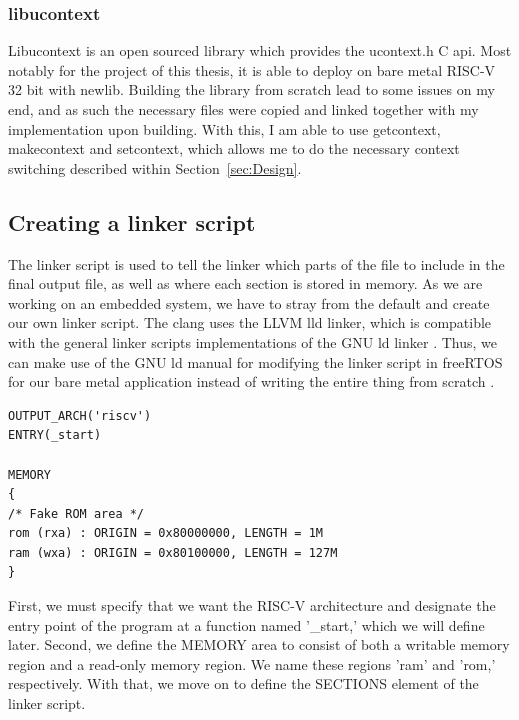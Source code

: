 \subsubsection*{libucontext}
Libucontext is an open sourced library which provides the ucontext.h C api. Most
notably for the project of this thesis, it is able to deploy on bare metal
RISC-V 32 bit with newlib. Building the library from scratch lead to some issues
on my end, and as such the necessary files were copied and linked together with
my implementation upon building. With this, I am able to use getcontext,
makecontext and setcontext, which allows me to do the necessary context
switching described within Section~\ref{sec:Design}.


\subsection{Creating a linker script}
The linker script is used to tell the linker which parts of the file to include
in the final output file, as well as where each section is stored in memory. As
we are working on an embedded system, we have to stray from the default and
create our own linker script. The clang uses the LLVM lld linker, which is
compatible with the general linker scripts implementations of the GNU ld linker
\cite{llvm-org-linker}. Thus, we can make use of the GNU ld manual for modifying
the linker script in freeRTOS for our bare metal application instead of writing
the entire thing from scratch \cite{GNU-linker}.

\begin{lstlisting}[caption=Memory area defined in linker script]
OUTPUT_ARCH('riscv')
ENTRY(_start)

MEMORY
{
/* Fake ROM area */
rom (rxa) : ORIGIN = 0x80000000, LENGTH = 1M
ram (wxa) : ORIGIN = 0x80100000, LENGTH = 127M
}
\end{lstlisting}
First, we must specify that we want the RISC-V architecture and designate the
entry point of the program at a function named '\_start,' which we will define
later. Second, we define the MEMORY area to consist of both a writable memory
region and a read-only memory region. We name these regions 'ram' and 'rom,'
respectively. With that, we move on to define the SECTIONS element of the linker
script.

